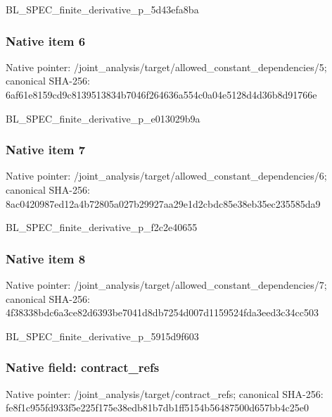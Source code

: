\documentclass[10pt,a4paper]{article}
\begin{document}
\begingroup\raggedright\sloppy BL\_\allowbreak{}SPEC\_\allowbreak{}finite\_\allowbreak{}derivative\_\allowbreak{}p\_\allowbreak{}5d43efa8ba\par\endgroup

\subsubsection{Native item 6}
Native pointer: /joint\_\allowbreak{}analysis/target/allowed\_\allowbreak{}constant\_\allowbreak{}dependencies/5; canonical SHA-256: 6af61e8159cd9c8139513834b7046f264636a554c0a04e5128d4d36b8d91766e

\begingroup\raggedright\sloppy BL\_\allowbreak{}SPEC\_\allowbreak{}finite\_\allowbreak{}derivative\_\allowbreak{}p\_\allowbreak{}e013029b9a\par\endgroup

\subsubsection{Native item 7}
Native pointer: /joint\_\allowbreak{}analysis/target/allowed\_\allowbreak{}constant\_\allowbreak{}dependencies/6; canonical SHA-256: 8ac0420987ed12a4b72805a027b29927aa29e1d2cbdc85e38eb35ec235585da9

\begingroup\raggedright\sloppy BL\_\allowbreak{}SPEC\_\allowbreak{}finite\_\allowbreak{}derivative\_\allowbreak{}p\_\allowbreak{}f2c2e40655\par\endgroup

\subsubsection{Native item 8}
Native pointer: /joint\_\allowbreak{}analysis/target/allowed\_\allowbreak{}constant\_\allowbreak{}dependencies/7; canonical SHA-256: 4f38338bdc6a3ce82d6393be7041d8db7254d007d1159524fda3eed3c34cc503

\begingroup\raggedright\sloppy BL\_\allowbreak{}SPEC\_\allowbreak{}finite\_\allowbreak{}derivative\_\allowbreak{}p\_\allowbreak{}5915d9f603\par\endgroup

\subsubsection{Native field: contract\_\allowbreak{}refs}
Native pointer: /joint\_\allowbreak{}analysis/target/contract\_\allowbreak{}refs; canonical SHA-256: fe8f1c955fd933f5e225f175e38edb81b7db1ff5154b56487500d657bb4c25e0
\end{document}

